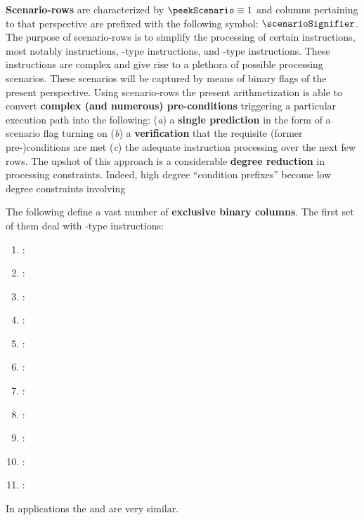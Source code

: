 \textbf{Scenario-rows} are characterized by $\peekScenario \equiv 1$ and columns pertaining to that perspective are prefixed with the following symbol: $\scenarioSignifier$. 
The purpose of scenario-rows is to simplify the processing of certain instructions, most notably
 instructions,
-type instructions, and
-type instructions.
These instructions are complex and give rise to a plethora of possible processing scenarios.
These scenarios will be captured by means of binary flags of the present perspective.
Using scenario-rows the present arithmetization is able to convert \textbf{complex (and numerous) pre-conditions} triggering a particular execution path into the following:
(\emph{a}) a \textbf{single prediction} in the form of a scenario flag turning on
(\emph{b}) a \textbf{verification} that the requisite (former pre-)conditions are met
(\emph{c}) the adequate instruction processing over the next few rows.
The upshot of this approach is a considerable \textbf{degree reduction} in processing constraints.
Indeed, high degree ``condition prefixes'' become low degree constraints involving 

The following define a vast number of \textbf{exclusive binary columns}.
The first set of them deal with -type instructions:
\begin{enumerate}
	\item \scenCallAbort:
	\item \scenCallToEoaCallerWontRevert:
	\item \scenCallToEoaCallerWillRevert:
	\item \scenCallToSmartContractCallerWontRevertCalleeSuccess:
	\item \scenCallToSmartContractCallerWontRevertCalleeFailure:
	\item \scenCallToSmartContractCallerWillRevertCalleeSuccess:
	\item \scenCallToSmartContractCallerWillRevertCalleeFailure:
	\item \scenCallToPrecompileSuccessCallerWontRevert:
	\item \scenCallToPrecompileSuccessCallerWillRevert:
	\item \scenCallToPrecompileFailureCallerWontRevert:
	\item \scenCallToPrecompileFailureCallerWillRevert:
\end{enumerate}
\saNote{} In applications the
\scenCallToPrecompileFailureCallerWontRevert{} and \scenCallToPrecompileFailureCallerWillRevert{}
are very similar.


